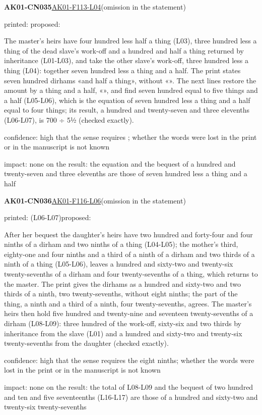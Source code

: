 \documentclass[11pt]{article}
\begin{document}
\noindent\textbf{AK01-CN035}\enspace\hyperlink{AK01-F113-L04}{AK01-F113-L04}\enspace(omission in the statement)\par\noindent printed: \enspace proposed: \par\noindent The master's heirs have four hundred less half a thing (L03), three hundred less a thing of the dead slave's work-off and a hundred and half a thing returned by inheritance (L01-L03), and take the other slave's work-off, three hundred less a thing (L04): together seven hundred less a thing and a half. The print states seven hundred dirhams «and half a thing», without «». The next lines restore the amount by a thing and a half, «», and find seven hundred equal to five things and a half (L05-L06), which is the equation of seven hundred less a thing and a half equal to four things; its result, a hundred and twenty-seven and three elevenths (L06-L07), is 700 ÷ 5½ (checked exactly).\par\noindent confidence: high that the sense requires ; whether the words were lost in the print or in the manuscript is not known\par\noindent impact: none on the result: the equation and the bequest of a hundred and twenty-seven and three elevenths are those of seven hundred less a thing and a half\par\medskip
\noindent\textbf{AK01-CN036}\enspace\hyperlink{AK01-F116-L06}{AK01-F116-L06}\enspace(omission in the statement)\par\noindent printed:  (L06-L07)\enspace proposed: \par\noindent After her bequest the daughter's heirs have two hundred and forty-four and four ninths of a dirham and two ninths of a thing (L04-L05); the mother's third, eighty-one and four ninths and a third of a ninth of a dirham and two thirds of a ninth of a thing (L05-L06), leaves a hundred and sixty-two and twenty-six twenty-sevenths of a dirham and four twenty-sevenths of a thing, which returns to the master. The print gives the dirhams as a hundred and sixty-two and two thirds of a ninth, two twenty-sevenths, without eight ninths; the part of the thing, a ninth and a third of a ninth, four twenty-sevenths, agrees. The master's heirs then hold five hundred and twenty-nine and seventeen twenty-sevenths of a dirham (L08-L09): three hundred of the work-off, sixty-six and two thirds by inheritance from the slave (L01) and a hundred and sixty-two and twenty-six twenty-sevenths from the daughter (checked exactly).\par\noindent confidence: high that the sense requires the eight ninths; whether the words were lost in the print or in the manuscript is not known\par\noindent impact: none on the result: the total of L08-L09 and the bequest of two hundred and ten and five seventeenths (L16-L17) are those of a hundred and sixty-two and twenty-six twenty-sevenths\par\medskip
\end{document}
